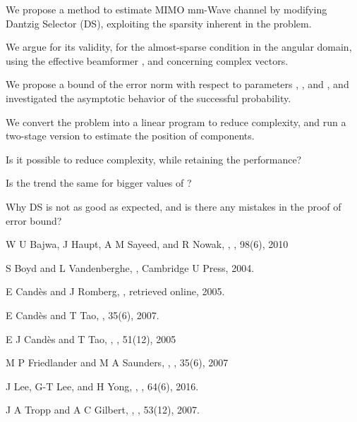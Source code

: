 {
\I We propose a method to estimate MIMO mm-Wave channel  by modifying Dantzig Selector (DS), exploiting the sparsity inherent in the problem.

\I We argue for its validity, for the almost-sparse condition in the angular domain, using the effective beamformer , and concerning complex vectors.

\I We propose a bound of the error norm with respect to parameters , , and , and investigated the asymptotic behavior of the successful probability.

\I We convert the problem into a linear program to reduce complexity, and run a two-stage version to estimate the position of components.
}
{
\I Is it possible to reduce complexity, while retaining the performance?

\I Is the trend the same for bigger values of ?

\I Why DS is not as good as expected, and is there any mistakes in the proof of error bound?
}
{
{\tfx
\I W U Bajwa, J Haupt, A M Sayeed, and R Nowak, , , 98(6), 2010

\I S Boyd and L Vandenberghe, , Cambridge U Press, 2004.

\I E Candès and J Romberg, , retrieved online, 2005.

\I E Candès and T Tao, ,  35(6), 2007.
}
}
{
{\tfx
\I E J Candès and T Tao, , , 51(12), 2005

\I M P Friedlander and M A Saunders, , , 35(6), 2007

\I J Lee, G-T Lee, and H Yong, , , 64(6), 2016.

\I J A Tropp and A C Gilbert, , , 53(12), 2007.
}
}
